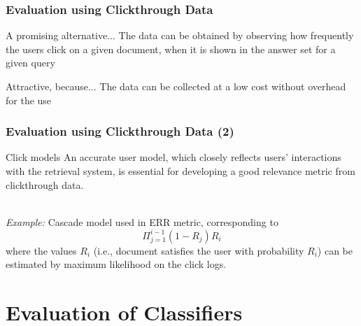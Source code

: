 \documentclass[svgnames]{beamer}
\begin{document}
\begin{frame}
  \frametitle{Evaluation using Clickthrough Data}

\begin{block}{A promising alternative...}
The data can be obtained by observing how frequently the users click on a given document, when it is shown in the answer set for a given query
\end{block}

\begin{block}{Attractive, because...}
The data can be collected at a low cost without overhead for the use
\end{block}
\end{frame}

\begin{frame} \frametitle{Evaluation using Clickthrough Data (2)}
\begin{block}{Click models}
An accurate user model, which closely reflects users’ interactions with the retrieval system, is essential for developing a good relevance metric from clickthrough data.

~\\
\emph{Example:} Cascade model used in ERR metric, corresponding to
\begin{displaymath}
\Pi_{j=1}^{i-1}(1 - R_j) R_i
\end{displaymath}
where the values $R_i$ (i.e., document satisfies the user with probability $R_i$) can be estimated by maximum likelihood on the click logs.
\end{block}
\end{frame}


\section{Evaluation of Classifiers}
\end{document}
